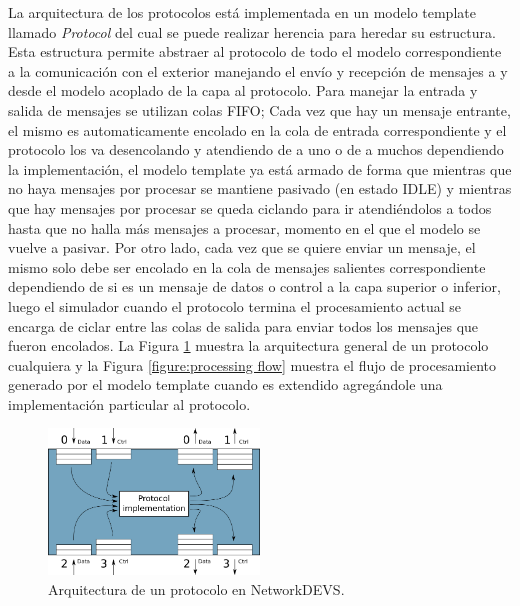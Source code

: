 \documentclass[10pt,a4paper]{article}
\begin{document}
La arquitectura de los protocolos está implementada en un modelo template llamado \textit{Protocol} del cual se puede realizar herencia para heredar su estructura. Esta estructura permite abstraer al protocolo de todo el modelo correspondiente a la comunicación con el exterior manejando el envío y recepción de mensajes a y desde el modelo acoplado de la capa al protocolo. Para manejar la entrada y salida de mensajes se utilizan colas FIFO; Cada vez que hay un mensaje entrante, el mismo es automaticamente encolado en la cola de entrada correspondiente y el protocolo los va desencolando y atendiendo de a uno o de a muchos dependiendo la implementación, el modelo template ya está armado de forma que mientras que no haya mensajes por procesar se mantiene pasivado (en estado IDLE) y mientras que hay mensajes por procesar se queda ciclando para ir atendiéndolos a todos hasta que no halla más mensajes a procesar, momento en el que el modelo se vuelve a pasivar. Por otro lado, cada vez que se quiere enviar un mensaje, el mismo solo debe ser encolado en la cola de mensajes salientes correspondiente dependiendo de si es un mensaje de datos o control a la capa superior o inferior, luego el simulador cuando el protocolo termina el procesamiento actual se encarga de ciclar entre las colas de salida para enviar todos los mensajes que fueron encolados. La Figura \ref{figure:protocol general architecture} muestra la arquitectura general de un protocolo cualquiera y la Figura \ref{figure:processing flow} muestra el flujo de procesamiento generado por el modelo template cuando es extendido agregándole una implementación particular al protocolo.

\begin{figure}[!bht]
    \centering
    \includegraphics[width = 0.5\textwidth]{img/png/protocol_architecture.png}
    \caption{Arquitectura de un protocolo en NetworkDEVS.}
    \label{figure:protocol general architecture}
\end{figure}
\end{document}
